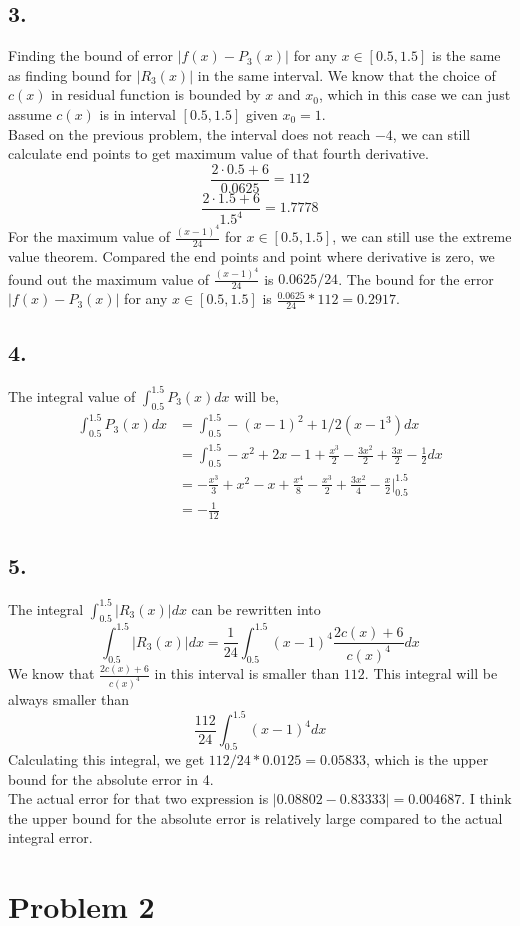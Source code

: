 \documentclass{article}
\begin{document}
\subsection*{3.}
Finding the bound of error $|f(x) - P_3(x)|$ for any $x \in [0.5,1.5]$ is the same as finding bound for $|R_3(x)|$ in the same interval.
We know that the choice of $c(x)$ in residual function is bounded by $x$ and $x_0$, which in this case we can just assume $c(x)$ is in interval $[0.5,1.5]$ given $x_0=1$.
\\
Based on the previous problem, the interval does not reach $-4$, we can still calculate end points to get maximum value of that fourth derivative.
$$\frac{2\cdot 0.5 + 6}{0.0625} = 112$$
$$\frac{2\cdot 1.5 + 6}{1.5^4} = 1.7778$$
For the maximum value of $\frac{(x-1)^4}{24}$ for $x \in [0.5,1.5]$, we can still use the extreme value theorem.
Compared the end points and point where derivative is zero, we found out the maximum value of $\frac{(x-1)^4}{24}$ is $0.0625/24$.
The bound for the error $|f(x) - P_3(x)|$ for any $x \in [0.5, 1.5]$ is $\frac{0.0625}{24} * 112 = 0.2917$.
\subsection*{4.}
The integral value of $\int_{0.5}^{1.5}P_3(x)dx$ will be,
\begin{align}
    \int_{0.5}^{1.5}P_3(x)dx &= \int_{0.5}^{1.5}-(x-1)^2 + 1/2(x-1^3)dx \nonumber \\
    &= \int_{0.5}^{1.5} -x^2 + 2x - 1 + \frac{x^3}{2} - \frac{3x^2}{2} + \frac{3x}{2} - \frac{1}{2}dx \nonumber \\
    &= -\frac{x^3}{3} + x^2 -x + \frac{x^4}{8} - \frac{x^3}{2} + \frac{3x^2}{4} - \frac{x}{2}\Bigg|_{0.5}^{1.5} \nonumber\\
    &= - \frac{1}{12} \nonumber
\end{align}



\subsection*{5.}
The integral $\int_{0.5}^{1.5}|R_3(x)|dx$ can be rewritten into
$$\int_{0.5}^{1.5}|R_3(x)|dx = \frac{1}{24}\int_{0.5}^{1.5}(x-1)^4 \frac{2c(x)+6}{c(x)^4}dx$$
We know that $\frac{2c(x)+6}{c(x)^4}$ in this interval is smaller than $112$.
This integral will be always smaller than
$$\frac{112}{24}\int_{0.5}^{1.5}(x-1)^4dx$$
Calculating this integral, we get $112/24 * 0.0125 = 0.05833$, which is the upper bound for the absolute error in 4.
\\
The actual error for that two expression is $|0.08802 - 0.83333| = 0.004687$. I think the upper bound for the absolute error is relatively large compared to the actual integral error.

\section*{Problem 2}
\end{document}
